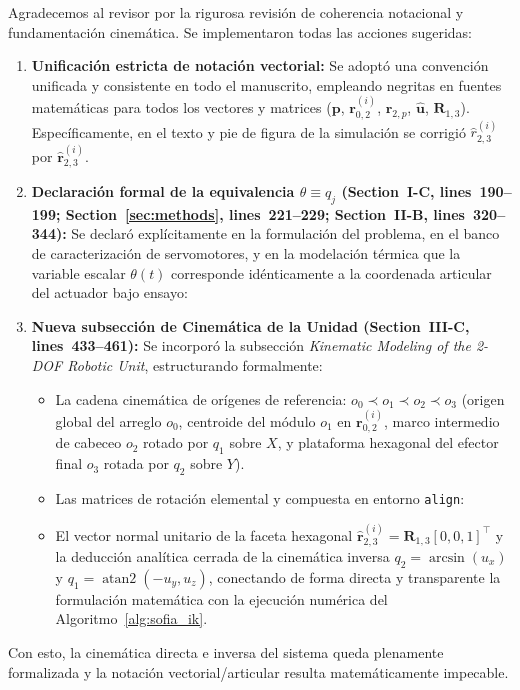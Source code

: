 \documentclass{LabDSTresponse}
\begin{document}
{Agradecemos al revisor por la rigurosa revisión de coherencia notacional y fundamentación cinemática. Se implementaron todas las acciones sugeridas:
\begin{enumerate}
    \item \textbf{Unificación estricta de notación vectorial:} Se adoptó una convención unificada y consistente en todo el manuscrito, empleando negritas en fuentes matemáticas para todos los vectores y matrices ($\mathbf{p}$, $\mathbf{r}_{0,2}^{(i)}$, $\mathbf{r}_{2,p}$, $\hat{\mathbf{u}}$, $\mathbf{R}_{1,3}$). Específicamente, en el texto y pie de figura de la simulación se corrigió $\hat{r}_{2,3}^{(i)}$ por $\hat{\mathbf{r}}_{2,3}^{(i)}$.
    \item \textbf{Declaración formal de la equivalencia $\theta \equiv q_j$ (Section~I-C, lines~190--199; Section~\ref{sec:methods}, lines~221--229; Section~II-B, lines~320--344):} Se declaró explícitamente en la formulación del problema, en el banco de caracterización de servomotores, y en la modelación térmica que la variable escalar $\theta(t)$ corresponde idénticamente a la coordenada articular del actuador bajo ensayo:
    \item \textbf{Nueva subsección de Cinemática de la Unidad (Section~III-C, lines~433--461):} Se incorporó la subsección \textit{Kinematic Modeling of the 2-DOF Robotic Unit}, estructurando formalmente:
    \begin{itemize}
        \item La cadena cinemática de orígenes de referencia: $o_0 \prec o_1 \prec o_2 \prec o_3$ (origen global del arreglo $o_0$, centroide del módulo $o_1$ en $\mathbf{r}_{0,2}^{(i)}$, marco intermedio de cabeceo $o_2$ rotado por $q_1$ sobre $X$, y plataforma hexagonal del efector final $o_3$ rotada por $q_2$ sobre $Y$).
        \item Las matrices de rotación elemental y compuesta en entorno \texttt{align}:
        \item El vector normal unitario de la faceta hexagonal $\hat{\mathbf{r}}_{2,3}^{(i)} = \mathbf{R}_{1,3}[0, 0, 1]^\top$ y la deducción analítica cerrada de la cinemática inversa $q_2 = \arcsin(u_x)$ y $q_1 = \operatorname{atan2}(-u_y, u_z)$, conectando de forma directa y transparente la formulación matemática con la ejecución numérica del Algoritmo~\ref{alg:sofia_ik}.
    \end{itemize}
\end{enumerate}
Con esto, la cinemática directa e inversa del sistema queda plenamente formalizada y la notación vectorial/articular resulta matemáticamente impecable.}
\end{document}
